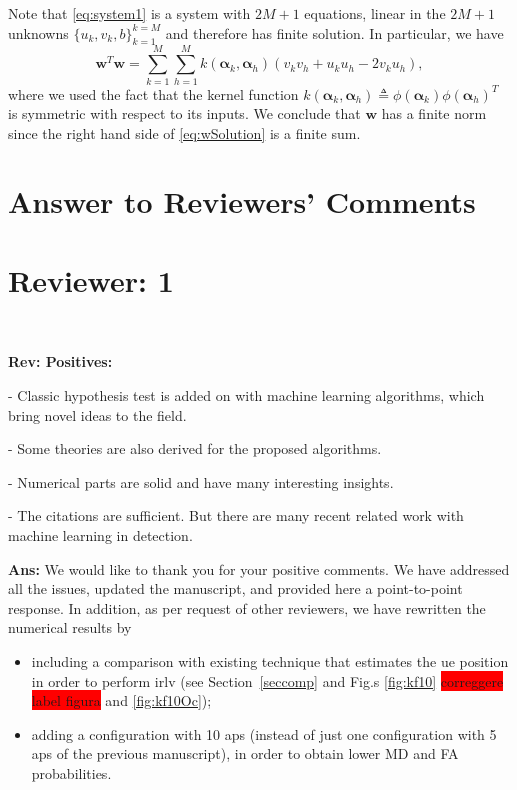 \documentclass[draftcls,onecolumn,12pt]{IEEEtran}
\newcommand{\wrt}{with respect to }
\begin{document}
	Note that \eqref{eq:system1} is a system with $2M + 1$ equations, linear in the $2M + 1$ unknowns $\{u_k,v_k,b\}_{k=1}^{k=M}$ and therefore has finite solution. In particular, we have
	\begin{equation}
	\label{eq:wSolution}
	\bm{w}^T\bm{w} =  \sum_{k=1}^{M} \sum_{h=1}^{M} k(\bm{\alpha}_k,\bm{\alpha}_h) (v_kv_h + u_ku_h -2 v_ku_h),
	\end{equation}
	where we used the fact that the kernel function
$
	k(\bm{\alpha}_k,\bm{\alpha}_h) \triangleq \phi(\bm{\alpha}_k) \phi(\bm{\alpha}_h)^T
$
	 is symmetric \wrt its inputs. 	We conclude that $\bm{w}$ has a finite norm since the right hand side of \eqref{eq:wSolution} is a finite sum.

%
%
\renewcommand*{\bibfont}{\footnotesize}

\printbibliography

\clearpage
\section*{Answer to Reviewers' Comments}
\section*{Reviewer: 1}

~


\begin{framed}
 {\bf Rev: Positives:

- Classic hypothesis test is added on with machine learning algorithms, which bring novel ideas to the field.

- Some theories are also derived for the proposed algorithms.

- Numerical parts are solid and have many interesting insights. 

- The citations are sufficient. But there are many recent related work with machine learning in detection.
}
\end{framed}


{\bf Ans:} We would like to thank you for your positive comments. We have addressed all the issues, updated the manuscript, and provided here a point-to-point response. In addition, as per request of other reviewers, we have rewritten the numerical results by 
\begin{itemize}
    \item including a comparison with existing technique that estimates the \ac{ue} position in order to perform \ac{irlv} (see Section~\ref{seccomp} and Fig.s \ref{fig:kf10} \colorbox{red}{correggere label figura} and \ref{fig:kf10Oc});
    \item adding a configuration with 10 \acp{ap} (instead of just one configuration with 5 \acp{ap} of the previous manuscript), in order to obtain lower MD and FA probabilities.
\end{itemize}
\end{document}
